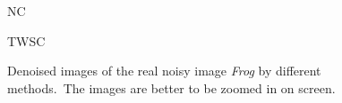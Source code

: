 \begin{figure}[t!]
{\begin{minipage}[t]{0.24\textwidth}
{\footnotesize NC}
\end{minipage}
\begin{minipage}[t]{0.24\textwidth}
\centering
{}
{\footnotesize TWSC}
\end{minipage}
}\vspace{-3mm}
\caption{Denoised images of the real noisy image \textsl{Frog} \cite{ncwebsite} by different methods.\ The images are better to be zoomed in on screen.}
    \label{fig5-9}
\end{figure}


